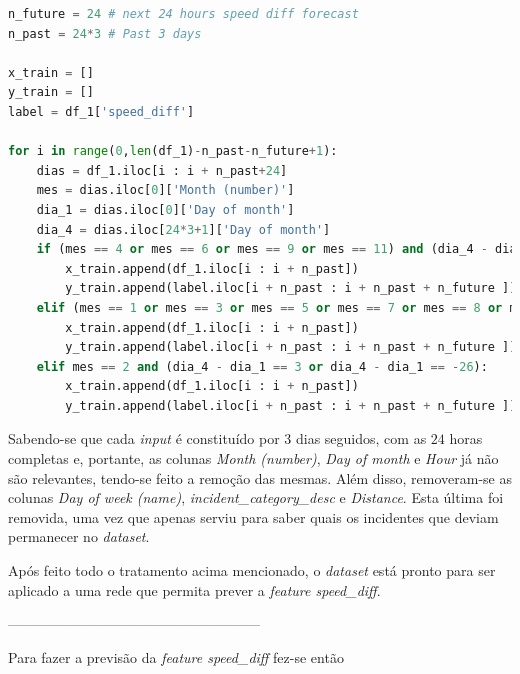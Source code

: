 \documentclass[a4paper, 12pt]{article}
\begin{document}
\begin{lstlisting}[language=Python]
n_future = 24 # next 24 hours speed diff forecast
n_past = 24*3 # Past 3 days

x_train = []
y_train = []
label = df_1['speed_diff']

for i in range(0,len(df_1)-n_past-n_future+1):
	dias = df_1.iloc[i : i + n_past+24]
	mes = dias.iloc[0]['Month (number)']
	dia_1 = dias.iloc[0]['Day of month']
	dia_4 = dias.iloc[24*3+1]['Day of month']
	if (mes == 4 or mes == 6 or mes == 9 or mes == 11) and (dia_4 - dia_1 == 3 or dia_4 - dia_1 == -29):
		x_train.append(df_1.iloc[i : i + n_past])
		y_train.append(label.iloc[i + n_past : i + n_past + n_future ])
	elif (mes == 1 or mes == 3 or mes == 5 or mes == 7 or mes == 8 or mes == 10 or mes == 12) and (dia_4 - dia_1 == 3 or dia_4 - dia_1 == -28):
		x_train.append(df_1.iloc[i : i + n_past])
		y_train.append(label.iloc[i + n_past : i + n_past + n_future ])
	elif mes == 2 and (dia_4 - dia_1 == 3 or dia_4 - dia_1 == -26):
		x_train.append(df_1.iloc[i : i + n_past])
		y_train.append(label.iloc[i + n_past : i + n_past + n_future ])
\end{lstlisting}

Sabendo-se que cada \textit{input} é constituído por $3$ dias seguidos, com as $24$ horas completas e, portante, as colunas \textit{Month (number)}, \textit{Day of month} e \textit{Hour} já não são relevantes, tendo-se feito a remoção das mesmas. Além disso, removeram-se as colunas \textit{Day of week (name)}, \textit{incident\_category\_desc} e \textit{Distance}. Esta última foi removida, uma vez que apenas serviu para saber quais os incidentes que deviam permanecer no \textit{dataset}.

Após feito todo o tratamento acima mencionado, o \textit{dataset} está pronto para ser aplicado a uma rede que permita prever a \textit{feature speed\_diff}.

------------------------------------------------------

Para fazer a previsão da \textit{feature speed\_diff} fez-se então 
\end{document}
